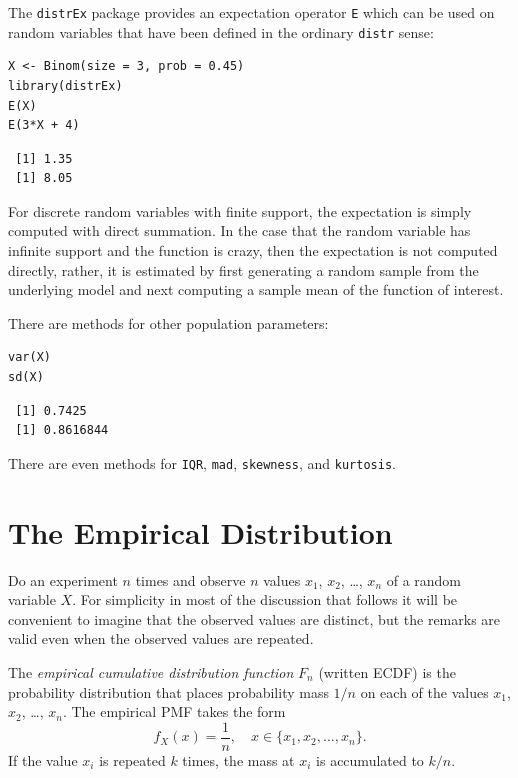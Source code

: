 \documentclass[captions=tableheading]{scrbook}
\begin{document}
The \texttt{distrEx} package provides an expectation operator \texttt{E} which can be used on random variables that have been defined in the ordinary \texttt{distr} sense:


\begin{verbatim}
X <- Binom(size = 3, prob = 0.45)
library(distrEx)
E(X)
E(3*X + 4)
\end{verbatim}

\begin{verbatim}
 [1] 1.35
 [1] 8.05
\end{verbatim}

For discrete random variables with finite support, the expectation is simply computed with direct summation. In the case that the random variable has infinite support and the function is crazy, then the expectation is not computed directly, rather, it is estimated by first generating a random sample from the underlying model and next computing a sample mean of the function of interest. 

There are methods for other population parameters:


\begin{verbatim}
var(X)
sd(X)
\end{verbatim}

\begin{verbatim}
 [1] 0.7425
 [1] 0.8616844
\end{verbatim}

There are even methods for \texttt{IQR}, \texttt{mad}, \texttt{skewness}, and \texttt{kurtosis}.
\section{The Empirical Distribution}
\label{sec-5-5}
\label{sec-empirical-distribution}


Do an experiment \(n\) times and observe \(n\) values \(x_{1}\), \(x_{2}\), \ldots{}, \(x_{n}\) of a random variable \(X\). For simplicity in most of the discussion that follows it will be convenient to imagine that the observed values are distinct, but the remarks are valid even when the observed values are repeated. 

\begin{defn}
The \emph{empirical cumulative distribution function} \(F_{n}\) (written ECDF) is the probability distribution that places probability mass \(1/n\) on each of the values \(x_{1}\), \(x_{2}\), \ldots{}, \(x_{n}\). The empirical PMF takes the form
\begin{equation} 
f_{X}(x)=\frac{1}{n},\quad x\in \{ x_{1},x_{2},...,x_{n} \}.
\end{equation}
If the value \(x_{i}\) is repeated \(k\) times, the mass at \(x_{i}\) is accumulated to \(k/n\).
\end{defn}
\end{document}
